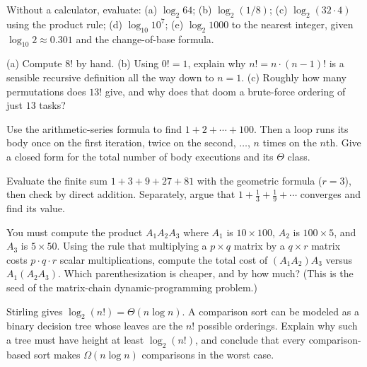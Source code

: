 \begin{exercise}
Without a calculator, evaluate: (a) $\log_2 64$; (b) $\log_2 (1/8)$;
(c) $\log_2(32 \cdot 4)$ using the product rule; (d) $\log_{10} 10^7$;
(e) $\log_2 1000$ to the nearest integer, given $\log_{10} 2 \approx 0.301$ and
the change-of-base formula.
\end{exercise}

\begin{exercise}
(a) Compute $8!$ by hand. (b) Using $0! = 1$, explain why $n! = n \cdot (n-1)!$ is
a sensible recursive definition all the way down to $n = 1$. (c) Roughly how many
permutations does $13!$ give, and why does that doom a brute-force ordering of
just $13$ tasks?
\end{exercise}

\begin{exercise}[Sum it up]
Use the arithmetic-series formula to find $1 + 2 + \cdots + 100$. Then a loop runs
its body once on the first iteration, twice on the second, $\dots$, $n$ times on
the $n$th. Give a closed form for the total number of body executions and its
$\Theta$ class.
\end{exercise}

\begin{exercise}
Evaluate the finite sum $1 + 3 + 9 + 27 + 81$ with the geometric formula
($r = 3$), then check by direct addition. Separately, argue that
$1 + \tfrac13 + \tfrac19 + \cdots$ converges and find its value.
\end{exercise}

\begin{exercise}
You must compute the product $A_1 A_2 A_3$ where $A_1$ is $10 \times 100$, $A_2$
is $100 \times 5$, and $A_3$ is $5 \times 50$. Using the rule that multiplying a
$p \times q$ matrix by a $q \times r$ matrix costs $p \cdot q \cdot r$ scalar
multiplications, compute the total cost of $(A_1 A_2) A_3$ versus
$A_1 (A_2 A_3)$. Which parenthesization is cheaper, and by how much? (This is the
seed of the matrix-chain dynamic-programming problem.)
\end{exercise}

\begin{exercise}
Stirling gives $\log_2(n!) = \Theta(n \log n)$. A comparison sort can be modeled
as a binary decision tree whose leaves are the $n!$ possible orderings. Explain
why such a tree must have height at least $\log_2(n!)$, and conclude that every
comparison-based sort makes $\Omega(n \log n)$ comparisons in the worst case.
\end{exercise}
